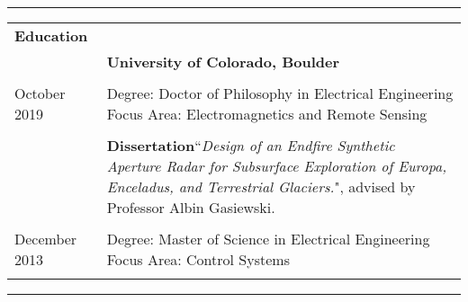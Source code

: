 \documentclass[letterpaper,12pt,oneside]{article}
\begin{document}
\noindent\rule{\textwidth}{1pt}
\vspace*{-1.5\baselineskip}
\begin{large}
\begin{spacing}{.8}	
\noindent \begin{longtable}{@{} p{4cm}l}
						
\Large{\textbf{Education}}		&\\
								& \textbf{University of Colorado, Boulder}\\	
								&\\
\parbox{4.0cm}{October 2019}			& \parbox{5.5in}{Degree: Doctor of Philosophy in Electrical Engineering\\  		
										  Focus Area: Electromagnetics and Remote Sensing}\\
		 						& \\
							  & \parbox{5.5in}{\textbf{Dissertation}``\textit{Design of an Endfire Synthetic Aperture Radar for Subsurface Exploration of Europa, Enceladus, and Terrestrial Glaciers.}", advised by Professor Albin Gasiewski.}\\

	&\\     					
	\parbox{4.0cm}{December 2013}		& \parbox{5.5in}{Degree: Master of Science in  Electrical 	 	Engineering\\						
     											 Focus Area: Control Systems}\\
     							&\\
\end{longtable}
\end{spacing}
\end{large}

\noindent\rule{\textwidth}{1pt}
\vspace*{-2.5\baselineskip}
\end{document}
